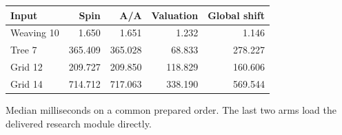 \begin{center}\small
\begin{tabular}{@{}lrrrr@{}}
\toprule
Input & Spin & A/A & Valuation & Global shift \\
\midrule
Weaving 10 & 1.650 & 1.651 & 1.232 & 1.146 \\
Tree 7 & 365.409 & 365.028 & 68.833 & 278.227 \\
Grid 12 & 209.727 & 209.850 & 118.829 & 160.606 \\
Grid 14 & 714.712 & 717.063 & 338.190 & 569.544 \\
\bottomrule
\end{tabular}
\end{center}
Median milliseconds on a common prepared order. The last two arms load the delivered research module directly.
